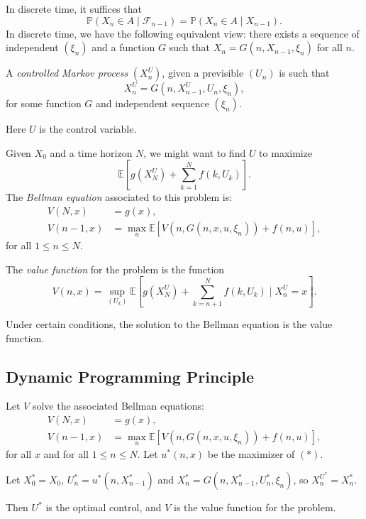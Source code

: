 \documentclass[12pt]{article}
\begin{document}
In discrete time, it suffices that
\[
\mathbb{P}(X_n \in A \mid \mathcal{F}_{n-1}) = \mathbb{P}(X_n \in A \mid X_{n-1}).
\]
In discrete time, we have the following equivalent view: there exists a sequence of independent $(\xi_n)$ and a function $G$ such that $X_n = G(n, X_{n-1}, \xi_n)$ for all $n$.

\begin{definition}
	A \emph{controlled Markov process} $(X_n^U)$, given a previsible $(U_n)$ is such that
	\[
	X_n^U = G(n, X_{n-1}^U, U_n, \xi_n),
	\]
	for some function $G$ and independent sequence $(\xi_n)$.

	Here $U$ is the control variable.
\end{definition}

\begin{exbox}
	Given $X_0$ and a time horizon $N$, we might want to find $U$ to maximize
	\[
	\mathbb{E}\left[g(X^U_N) + \sum_{k = 1}^N f(k, U_k)\right].
	\]
	The \emph{Bellman equation} associated to this problem is:
	\begin{align*}
		V(N, x) &= g(x), \\
		V(n-1, x) &= \max_u \mathbb E \left[ V(n, G(n, x, u, \xi_n)) + f(n, u) \right],
	\end{align*}
	for all $1 \leq n \leq N$.
\end{exbox}

\begin{definition}
	The \emph{value function} for the problem is the function
	\[
	V(n, x) = \sup_{(U_k)} \mathbb{E}\left[ g(X_N^U) + \sum_{k = n + 1}^N f(k, U_k) \mid X_n^U = x \right].
	\]
\end{definition}

Under certain conditions, the solution to the Bellman equation is the value function.


\subsection{Dynamic Programming Principle}
\label{sub:dpp}

\begin{theorem}
	Let $V$ solve the associated Bellman equations:
	\begin{align*}
		V(N, x) &= g(x), \\
		V(n-1, x) &= \max_u \mathbb E \left[ V(n, G(n, x, u, \xi_n)) + f(n, u) \right], \tag{$\ast$}
	\end{align*}
	for all $x$ and for all $1 \leq n \leq N$. Let $u^\ast(n, x)$ be the maximizer of $(\ast)$.

	Let $X_0^\ast = X_0$, $U_n^\ast = u^\ast(n, X_{n-1}^\ast)$ and $X_n^\ast = G(n, X_{n-1}^\ast, U_n^\ast, \xi_n)$, so $X_n^{U^\ast} = X_n^\ast$.

	Then $U^\ast$ is the optimal control, and $V$ is the value function for the problem.
\end{theorem}
\end{document}
